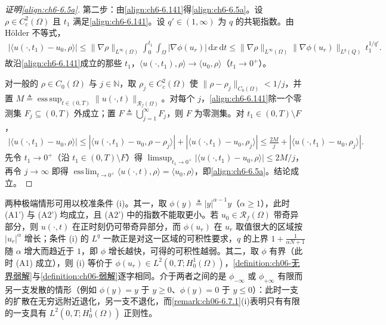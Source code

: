 \documentclass[../../main.tex]{subfiles}%
\begin{document}
\begin{proof}[证明\eqref{align:ch6-6.5a}]
第二步：由\eqref{align:ch6-6.141}得\eqref{align:ch6-6.5a}。设 $\rho\in C^2_c(\Omega)$ 且 $t_1$ 满足\eqref{align:ch6-6.141}。设 $q'\in(1,\infty)$ 为 $q$ 的共轭指数。由 Hölder 不等式，
\begin{align*}
\left|\langle u(\cdot,t_1)-u_0,\rho\rangle\right|
\leqslant\|\nabla\rho\|_{L^\infty(\Omega)}\int_0^{t_1}\int_\Omega|\nabla\phi(u_r)|\,\mathrm{d}x\,\mathrm{d}t
\leqslant\|\nabla\rho\|_{L^\infty(\Omega)}\|\nabla\phi(u_r)\|_{L^q(Q)}\,t_1^{1/q'} .
\end{align*}
故沿\eqref{align:ch6-6.141}成立的那些 $t_1$，$\langle u(\cdot,t_1),\rho\rangle\to\langle u_0,\rho\rangle$（$t_1\to0^+$）。

对一般的 $\rho\in C_0(\Omega)$ 与 $j\in\mathbb{N}$，取 $\rho_j\in C^2_c(\Omega)$ 使 $\|\rho-\rho_j\|_{C_0(\Omega)}<1/j$，并置 $M\triangleq\operatorname{ess\,sup}_{t\in(0,T)}\|u(\cdot,t)\|_{\mathscr{R}_f(\Omega)}$。对每个 $j$，\eqref{align:ch6-6.141}除一个零测集 $F_j\subseteq(0,T)$ 外成立；置 $F\triangleq\bigcup_{j=1}^{\infty}F_j$，则 $F$ 为零测集。对 $t_1\in(0,T)\setminus F$，
\begin{align*}
\left|\langle u(\cdot,t_1)-u_0,\rho\rangle\right|
\leqslant\left|\langle u(\cdot,t_1)-u_0,\rho-\rho_j\rangle\right|
+\left|\langle u(\cdot,t_1)-u_0,\rho_j\rangle\right|
\leqslant\frac{2M}{j}+\left|\langle u(\cdot,t_1)-u_0,\rho_j\rangle\right| .
\end{align*}
先令 $t_1\to0^+$（沿 $t_1\in(0,T)\setminus F$）得 $\limsup_{t_1\to0^+}|\langle u(\cdot,t_1)-u_0,\rho\rangle|\leqslant2M/j$，再令 $j\to\infty$ 即得 $\operatorname*{ess\,lim}_{t\to0^+}\langle u(\cdot,t),\rho\rangle=\langle u_0,\rho\rangle$，即\eqref{align:ch6-6.5a}。结论成立。
\end{proof}

\begin{remark}\label{remark:ch06-无界弱解例}
两种极端情形可用以校准条件 (i)。其一，取 $\phi(y)\triangleq|y|^{\alpha-1}y$（$\alpha\geqslant1$），此时 (A1') 与 (A2') 均成立，且 (A2') 中的指数不能取更小。若 $u_0\in\mathscr{R}_f(\Omega)$ 带奇异部分，则 $u(\cdot,t)$ 在正时刻仍可带奇异部分，而 $\phi(u_r)$ 在 $u_r$ 取值很大的区域按 $|u_r|^{\alpha}$ 增长；条件 (i) 的 $L^q$ 一款正是对这一区域的可积性要求，$q$ 的上界 $1+\frac{1}{\alpha N+1}$ 随 $\alpha$ 增大而趋近于 $1$，即 $\phi$ 增长越快，可得的可积性越弱。其二，取 $\phi$ 有界（此时 (A1) 成立），则 (i) 等价于 $\phi(u_r)\in L^2(0,T;H^1_0(\Omega))$，\cref{definition:ch06-无界弱解}与\cref{definition:ch06-弱解}逐字相同。介于两者之间的是 $\phi_{-\infty}$ 或 $\phi_{+\infty}$ 有限而另一支发散的情形（例如 $\phi(y)=y$ 于 $y\geqslant0$、$\phi(y)=0$ 于 $y\leqslant0$）：此时一支的扩散在无穷远附近退化，另一支不退化，而\cref{remark:ch06-6.7.1}(i)表明只有有限的一支具有 $L^2(0,T;H^1_0(\Omega))$ 正则性。
\end{remark}
\end{document}
